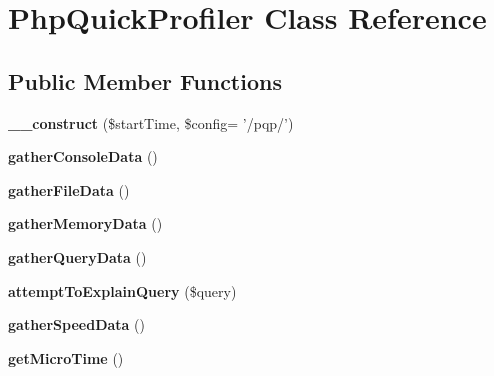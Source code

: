\hypertarget{class_php_quick_profiler}{
\section{PhpQuickProfiler Class Reference}
\label{class_php_quick_profiler}
}
\subsection*{Public Member Functions}
\begin{DoxyCompactItemize}
\item 
\hypertarget{class_php_quick_profiler_a85eacf5bc4132c65d47a6e9e2c917af7}{
{\bfseries \_\-\_\-construct} (\$startTime, \$config= '/pqp/')}
\label{class_php_quick_profiler_a85eacf5bc4132c65d47a6e9e2c917af7}

\item 
\hypertarget{class_php_quick_profiler_a07b1710f9f33880737147e06197d5d33}{
{\bfseries gatherConsoleData} ()}
\label{class_php_quick_profiler_a07b1710f9f33880737147e06197d5d33}

\item 
\hypertarget{class_php_quick_profiler_abfdef1cbaeefa983a0ea79614877f946}{
{\bfseries gatherFileData} ()}
\label{class_php_quick_profiler_abfdef1cbaeefa983a0ea79614877f946}

\item 
\hypertarget{class_php_quick_profiler_a684e1aa5f92b6689726965f05a3f97ca}{
{\bfseries gatherMemoryData} ()}
\label{class_php_quick_profiler_a684e1aa5f92b6689726965f05a3f97ca}

\item 
\hypertarget{class_php_quick_profiler_ae1d87b3c49d0b470bbe0f933cddeb27c}{
{\bfseries gatherQueryData} ()}
\label{class_php_quick_profiler_ae1d87b3c49d0b470bbe0f933cddeb27c}

\item 
\hypertarget{class_php_quick_profiler_a35e3615cdcfffe53d092634b1c970c13}{
{\bfseries attemptToExplainQuery} (\$query)}
\label{class_php_quick_profiler_a35e3615cdcfffe53d092634b1c970c13}

\item 
\hypertarget{class_php_quick_profiler_af48583e7748f8128addbac37ddcb6e2f}{
{\bfseries gatherSpeedData} ()}
\label{class_php_quick_profiler_af48583e7748f8128addbac37ddcb6e2f}

\item 
\hypertarget{class_php_quick_profiler_a83ff2cccfdfaf38ba29c8c6d04586deb}{
{\bfseries getMicroTime} ()}
\label{class_php_quick_profiler_a83ff2cccfdfaf38ba29c8c6d04586deb}


\end{DoxyCompactItemize}
